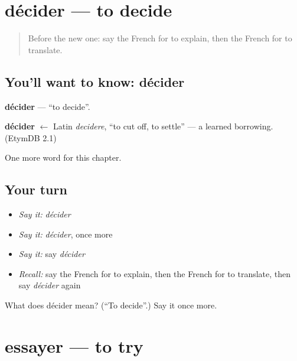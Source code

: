\section[décider]{décider — to decide}

\label{lesson:FR-C144-decider}



\begin{quote}
Before the new one: say the French for to explain, then the French for to translate.
\end{quote}

\subsection*{You'll want to know: décider}
\textbf{décider} — \textquotedblleft{}to decide\textquotedblright{}.

\begin{cousinweb}
\textbf{décider} $\leftarrow$ Latin \emph{decidere}, \textquotedblleft{}to cut off, to settle\textquotedblright{} — a learned borrowing. (EtymDB 2.1)
\end{cousinweb}

\begin{grammarlens}[title={What you've built}]
One more word for this chapter.
\end{grammarlens}

\subsection*{Your turn}
\begin{itemize}
\raggedright
  \item \emph{Say it:} \emph{décider}
  \item \emph{Say it:} \emph{décider}, once more
  \item \emph{Say it:} say \emph{décider}
  \item \emph{Recall:} say the French for to explain, then the French for to translate, then say \emph{décider} again
\end{itemize}

\begin{tcolorbox}[breakable,colback=teal!4,colframe=teal!35!black,title={Before you move on}]
What does décider mean? (\textquotedblleft{}To decide\textquotedblright{}.) Say it once more.
\end{tcolorbox}
\section[essayer]{essayer — to try}

